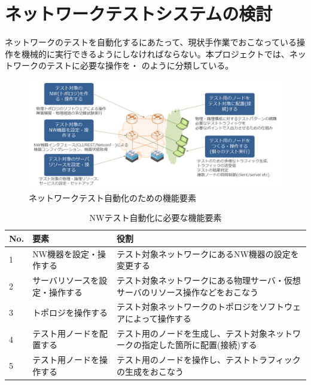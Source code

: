  \section{ネットワークテストシステムの検討}
 \label{sec:discuss-network-test}


ネットワークのテストを自動化するにあたって、現状手作業でおこなっている操
作を機械的に実行できるようにしなければならない。本プロジェクトでは、ネッ
トワークのテストに必要な操作を・
のように分類している。

\begin{figure}[h]
 \centering
 \includegraphics[scale=0.5]{img/features-of-network-testing.png}
 \caption{ネットワークテスト自動化のための機能要素}
 \label{fig:features-of-network-testing}
\end{figure}

\begin{table}[h]
 \caption{NWテスト自動化に必要な機能要素}
 \label{tab:test-functions}
 \begin{tabularx}{\linewidth}{l|l|X}
  \hline
  No. & 要素 & 役割 \\ \hline
  \hline
  1 & NW機器を設定・操作する & テスト対象ネットワークにあるNW機器の設定を変更する \\ \hline
  2 & サーバリソースを設定・操作する & テスト対象ネットワークにある物理サーバ・仮想サーバのリソース操作などをおこなう \\ \hline
  3 & トポロジを操作する & テスト対象ネットワークのトポロジをソフトウェアによって操作する \\ \hline
  4 & テスト用ノードを配置する & テスト用のノードを生成し、テスト対象ネットワークの指定した箇所に配置(接続)する \\ \hline
  5 &テスト用ノードを操作する & テスト用のノードを操作し、テストトラフィックの生成をおこなう\\ \hline
 \end{tabularx}
\end{table}

